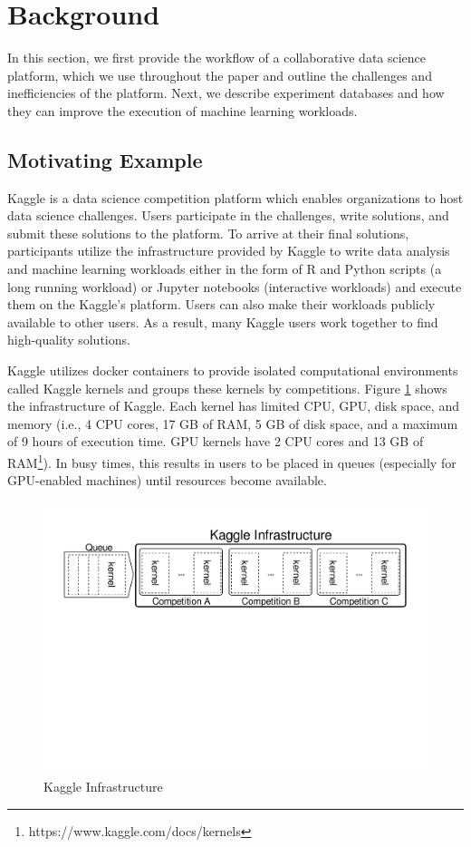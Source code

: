 \section{Background} \label{sec-background}
In this section, we first provide the workflow of a collaborative data science platform, which we use throughout the paper and outline the challenges and inefficiencies of the platform.
Next, we describe experiment databases and how they can improve the execution of machine learning workloads.

\subsection{Motivating Example}\label{subsec-motivational-example}
Kaggle is a data science competition platform which enables organizations to host data science challenges.
Users participate in the challenges, write solutions, and submit these solutions to the platform.
To arrive at their final solutions, participants utilize the infrastructure provided by Kaggle to write data analysis and machine learning workloads either in the form of R and Python scripts (a long running workload) or Jupyter notebooks (interactive workloads) and execute them on the Kaggle's platform.
Users can also make their workloads publicly available to other users.
As a result, many Kaggle users work together to find high-quality solutions.

Kaggle utilizes docker containers to provide isolated computational environments called Kaggle kernels and groups these kernels by competitions.
Figure \ref{example-use-case} shows the infrastructure of Kaggle.
Each kernel has limited CPU, GPU, disk space, and memory (i.e., 4 CPU cores, 17 GB of RAM, 5 GB of disk space, and a maximum of 9 hours of execution time. GPU kernels have 2 CPU cores and 13 GB of RAM\footnote{https://www.kaggle.com/docs/kernels}).
In busy times, this results in users to be placed in queues (especially for GPU-enabled machines) until resources become available.

\begin{figure}
\centering
\includegraphics[width=\columnwidth]{../images/example-use-case}
\caption{Kaggle Infrastructure}
\label{example-use-case}
\end{figure}

